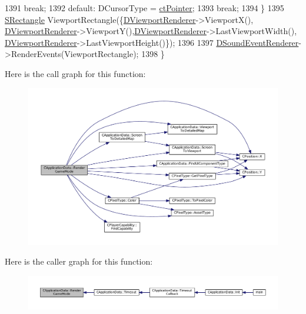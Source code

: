 \begin{DoxyCode}
1391                                     \textcolor{keywordflow}{break};
1392         \textcolor{keywordflow}{default}:                    DCursorType = \hyperlink{classCApplicationData_ad024b66b60017c45c47a85dbc636ae69aae3df9571a0bd8f05d668cca8871dbc0}{ctPointer};
1393                                     \textcolor{keywordflow}{break};
1394     \}
1395     \hyperlink{structSRectangle}{SRectangle} ViewportRectangle(\{\hyperlink{classCApplicationData_a31da050ebca942272344c8b736d72848}{DViewportRenderer}->ViewportX(),
      \hyperlink{classCApplicationData_a31da050ebca942272344c8b736d72848}{DViewportRenderer}->ViewportY(),\hyperlink{classCApplicationData_a31da050ebca942272344c8b736d72848}{DViewportRenderer}->LastViewportWidth(),
      \hyperlink{classCApplicationData_a31da050ebca942272344c8b736d72848}{DViewportRenderer}->LastViewportHeight()\});
1396     
1397     \hyperlink{classCApplicationData_af2959556fc881145d9d777c627a9345d}{DSoundEventRenderer}->RenderEvents(ViewportRectangle);
1398 \}
\end{DoxyCode}
Here is the call graph for this function\+:\nopagebreak
\begin{figure}[H]
\begin{center}
\leavevmode
\includegraphics[width=350pt]{classCApplicationData_ae5ba05c6fb7e6f0414c26f0b44bc842c_cgraph}
\end{center}
\end{figure}
Here is the caller graph for this function\+:\nopagebreak
\begin{figure}[H]
\begin{center}
\leavevmode
\includegraphics[width=350pt]{classCApplicationData_ae5ba05c6fb7e6f0414c26f0b44bc842c_icgraph}
\end{center}
\end{figure}
\hypertarget{classCApplicationData_a72fff3a266be49b3e9f323dcfe545923}{}\label{classCApplicationData_a72fff3a266be49b3e9f323dcfe545923} 
